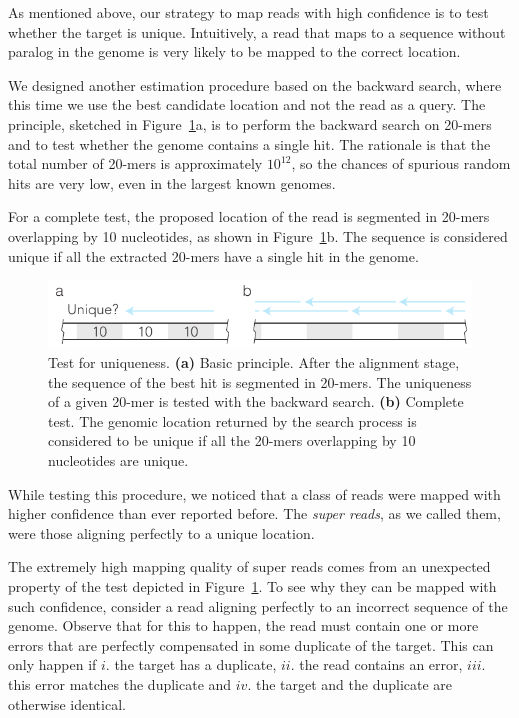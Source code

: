 \documentclass[a4,center,fleqn]{NAR}
\begin{document}
As mentioned above, our strategy to map reads with high confidence is to
test whether the target is unique. Intuitively, a read that maps to a
sequence without paralog in the genome is very likely to be mapped to the
correct location.

We designed another estimation procedure based on the backward search,
where this time we use the best candidate location and not the read as a
query. The principle, sketched in Figure~\ref{fig_supertest}a, is to
perform the backward search on 20-mers and to test whether the genome
contains a single hit. The rationale is that the
total number of 20-mers is approximately $10^{12}$, so the chances of
spurious random hits are very low, even in the largest known genomes.

For a complete test, the proposed location of the read is segmented in
20-mers overlapping by 10 nucleotides, as shown in
Figure~\ref{fig_supertest}b. The sequence is considered unique if all the
extracted 20-mers have a single hit in the genome.

\begin{figure}[t]
\begin{center}
\includegraphics[scale=.75]{supertest.pdf}
\end{center}
\caption{Test for uniqueness. \textbf{(a)} Basic principle. After the
alignment stage, the sequence of the best hit is segmented in 20-mers. The
uniqueness of a given 20-mer is tested with the backward search.
\textbf{(b)} Complete test. The genomic location returned by the search
process is considered to be unique if all the 20-mers overlapping by 10
nucleotides are unique.}
\label{fig_supertest}
\end{figure}

While testing this procedure, we noticed that a class of reads were mapped
with higher confidence than ever reported before. The \emph{super reads},
as we called them, were those aligning perfectly to a unique location.

The extremely high mapping quality of super reads comes from an unexpected
property of the test depicted in Figure~\ref{fig_supertest}. To see why
they can be mapped with such confidence, consider a read aligning
perfectly to an incorrect sequence of the genome. Observe that for
this to happen, the read must contain one or more errors that are perfectly
compensated in some duplicate of the target. This can only happen if $i.$
the target has a duplicate, $ii.$ the read contains an error, $iii.$ this
error matches the duplicate and $iv.$ the target and the duplicate are
otherwise identical.
\end{document}
